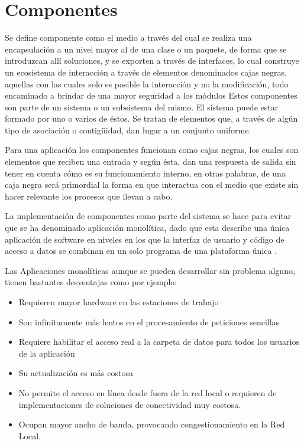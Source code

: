 \chapter{Componentes}

Se define componente como el medio a través del cual se realiza una encapsulación a un nivel mayor al de una clase o un paquete, de forma que se introduzcan allí soluciones, y se exporten a través de interfaces, lo cual construye un ecosistema de interacción a través de elementos denominados cajas negras, aquellas con las cuales solo es posible la interacción y no la modificación, todo encaminado a brindar de una mayor seguridad a los módulos Estos componentes son parte de un sistema o un subsistema del mismo. El sistema puede estar formado por uno o varios de éstos. Se tratan de elementos que, a través de algún tipo de asociación o contigüidad, dan lugar a un conjunto uniforme.\nocite{Notas}

Para una aplicación los componentes funcionan como cajas negras, los cuales son elementos que reciben una entrada y según ésta, dan una respuesta de salida sin tener en cuenta cómo es su funcionamiento interno, en otras palabras, de una caja negra será primordial la forma en que interactua con el medio que existe sin hacer relevante los procesos que llevan a cabo.

La implementación de componentes como parte del sistema se hace para evitar que se ha denominado aplicación monolítica, dado que esta describe una única aplicación de software en niveles en los que la interfaz de usuario y código de acceso a datos se combinan en un solo programa de una plataforma única \cite{Pw6AM}.

Las Aplicaciones monolíticas aunque se pueden desarrollar sin problema alguno, tienen bastantes desventajas como por ejemplo:

\begin{itemize}
		\item Requieren mayor hardware en las estaciones de trabajo
		\item Son infinitamente más lentos en el procesamiento de peticiones sencillas
		\item Requiere habilitar el acceso real a la carpeta de datos para todos los usuarios de la aplicación 
		\item Su actualización es más costosa
		\item No permite el acceso en línea desde fuera de la red local o requieren de implementaciones de soluciones de conectividad muy costosa.
		\item Ocupan mayor ancho de banda, provocando congestionamiento en la Red Local.
\end{itemize}

